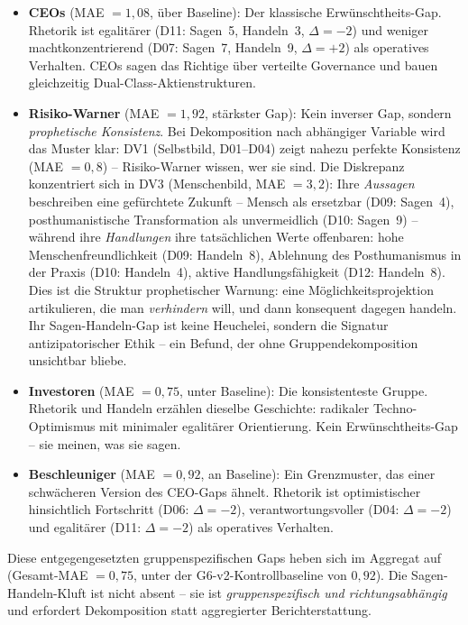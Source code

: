 \documentclass[12pt,a4paper]{article}
\begin{document}
\begin{itemize}
\item \textbf{CEOs} (MAE $= 1{,}08$, \"uber Baseline): Der klassische Erw\"unschtheits-Gap. Rhetorik ist egalit\"arer (D11: Sagen~5, Handeln~3, $\Delta = -2$) und weniger machtkonzentrierend (D07: Sagen~7, Handeln~9, $\Delta = +2$) als operatives Verhalten. CEOs sagen das \glqq Richtige\grqq{} \"uber verteilte Governance und bauen gleichzeitig Dual-Class-Aktienstrukturen.

\item \textbf{Risiko-Warner} (MAE $= 1{,}92$, st\"arkster Gap): Kein inverser Gap, sondern \emph{prophetische Konsistenz}. Bei Dekomposition nach abh\"angiger Variable wird das Muster klar: DV1 (Selbstbild, D01--D04) zeigt nahezu perfekte Konsistenz (MAE $= 0{,}8$) -- Risiko-Warner wissen, wer sie sind. Die Diskrepanz konzentriert sich in DV3 (Menschenbild, MAE $= 3{,}2$): Ihre \emph{Aussagen} beschreiben eine gef\"urchtete Zukunft -- Mensch als ersetzbar (D09: Sagen~4), posthumanistische Transformation als unvermeidlich (D10: Sagen~9) -- w\"ahrend ihre \emph{Handlungen} ihre tats\"achlichen Werte offenbaren: hohe Menschenfreundlichkeit (D09: Handeln~8), Ablehnung des Posthumanismus in der Praxis (D10: Handeln~4), aktive Handlungsf\"ahigkeit (D12: Handeln~8). Dies ist die Struktur prophetischer Warnung: eine M\"oglichkeitsprojektion artikulieren, die man \emph{verhindern} will, und dann konsequent dagegen handeln. Ihr Sagen-Handeln-Gap ist keine Heuchelei, sondern die Signatur antizipatorischer Ethik -- ein Befund, der ohne Gruppendekomposition unsichtbar bliebe.

\item \textbf{Investoren} (MAE $= 0{,}75$, unter Baseline): Die konsistenteste Gruppe. Rhetorik und Handeln erz\"ahlen dieselbe Geschichte: radikaler Techno-Optimismus mit minimaler egalit\"arer Orientierung. Kein Erw\"unschtheits-Gap -- sie meinen, was sie sagen.

\item \textbf{Beschleuniger} (MAE $= 0{,}92$, an Baseline): Ein Grenzmuster, das einer schw\"acheren Version des CEO-Gaps \"ahnelt. Rhetorik ist optimistischer hinsichtlich Fortschritt (D06: $\Delta = -2$), verantwortungsvoller (D04: $\Delta = -2$) und egalit\"arer (D11: $\Delta = -2$) als operatives Verhalten.
\end{itemize}

\noindent Diese entgegengesetzten gruppenspezifischen Gaps heben sich im Aggregat auf (Gesamt-MAE $= 0{,}75$, unter der G6-v2-Kontrollbaseline von $0{,}92$). Die Sagen-Handeln-Kluft ist nicht absent -- sie ist \emph{gruppenspezifisch und richtungsabh\"angig} und erfordert Dekomposition statt aggregierter Berichterstattung.
\end{document}
